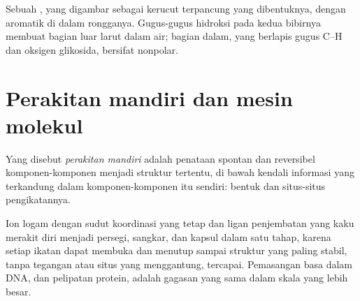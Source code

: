 \begin{omfigure}

{\small Sebuah , yang digambar sebagai kerucut terpancung yang dibentuknya, dengan 
aromatik di dalam rongganya. Gugus-gugus hidroksi pada kedua bibirnya membuat bagian luar
larut dalam air; bagian dalam, yang berlapis gugus C--H dan oksigen glikosida,
bersifat nonpolar.}
\end{omfigure}

\section{Perakitan mandiri dan mesin molekul}

\begin{definition}\label{def:b3:supramolecular:self-assembly}
Yang disebut \emph{perakitan mandiri} adalah penataan spontan dan reversibel
komponen-komponen menjadi struktur tertentu, di bawah kendali
informasi yang terkandung dalam komponen-komponen itu sendiri: bentuk dan situs-situs
pengikatannya.
\end{definition}

Ion logam dengan sudut koordinasi yang tetap dan ligan penjembatan yang kaku merakit diri
menjadi persegi, sangkar, dan kapsul dalam satu tahap, karena setiap ikatan dapat membuka
dan menutup sampai struktur yang paling stabil, tanpa tegangan atau situs yang menggantung,
tercapai. Pemasangan basa dalam DNA, dan pelipatan protein, adalah gagasan yang sama
dalam skala yang lebih besar.

